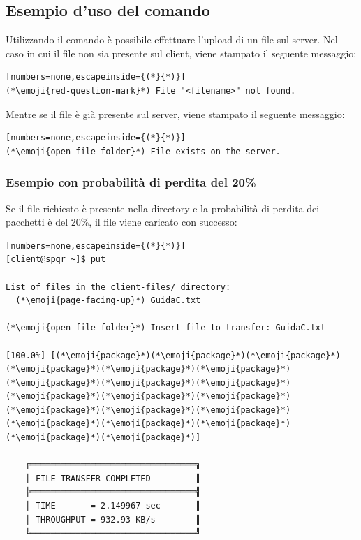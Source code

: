 \subsection{Esempio d'uso del comando }
Utilizzando il comando  è possibile effettuare l'upload di un file sul server.
Nel caso in cui il file non sia presente sul client, viene stampato il seguente messaggio:

\begin{lstlisting}[numbers=none,escapeinside={(*}{*)}]
(*\emoji{red-question-mark}*) File "<filename>" not found.
\end{lstlisting}

Mentre se il file è già presente sul server, viene stampato il seguente messaggio:

\begin{lstlisting}[numbers=none,escapeinside={(*}{*)}]
(*\emoji{open-file-folder}*) File exists on the server.
\end{lstlisting}

\subsubsection{Esempio con probabilità di perdita del 20\%}
Se il file richiesto è presente nella directory  e la probabilità di perdita dei pacchetti è del 20\%, il file viene caricato con successo:

\begin{lstlisting}[numbers=none,escapeinside={(*}{*)}]
[client@spqr ~]$ put

List of files in the client-files/ directory:
  (*\emoji{page-facing-up}*) GuidaC.txt
    
(*\emoji{open-file-folder}*) Insert file to transfer: GuidaC.txt

[100.0%] [(*\emoji{package}*)(*\emoji{package}*)(*\emoji{package}*)(*\emoji{package}*)(*\emoji{package}*)(*\emoji{package}*)(*\emoji{package}*)(*\emoji{package}*)(*\emoji{package}*)(*\emoji{package}*)(*\emoji{package}*)(*\emoji{package}*)(*\emoji{package}*)(*\emoji{package}*)(*\emoji{package}*)(*\emoji{package}*)(*\emoji{package}*)(*\emoji{package}*)(*\emoji{package}*)(*\emoji{package}*)]

    ╔═════════════════════════════════╗
    ║ FILE TRANSFER COMPLETED         ║
    ╠═════════════════════════════════╣
    ║ TIME       = 2.149967 sec       ║
    ║ THROUGHPUT = 932.93 KB/s        ║
    ╚═════════════════════════════════╝   
\end{lstlisting}

